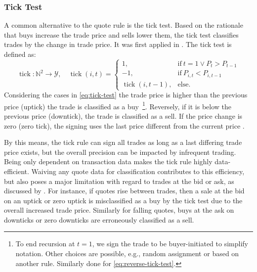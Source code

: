 \subsubsection{Tick Test}\label{sec:tick-test}

A common alternative to the quote rule is the tick test. Based on the rationale that buys increase the trade price and sells lower them, the tick test classifies trades by the change in trade price. It was first applied in \textcites[][244]{holthausenEffectLargeBlock1987}[][240]{hasbrouckTradesQuotesInventories1988}. The tick test is defined as:
\begin{equation}
    \operatorname{tick}\colon \mathbb{N}^2 \to \mathcal{Y},\quad
    \operatorname{tick}(i, t)=
    \begin{cases}
        1,                           & \mathrm{if}\ t=1 \lor P_{t}>P_{t-1} \\
        -1,                          & \mathrm{if}\ P_{i, t} < P_{i, t-1}  \\
        \operatorname{tick}(i, t-1), & \mathrm{else}.
    \end{cases}
    \label{eq:tick-test}
\end{equation}
Considering the cases in \cref{eq:tick-test} the trade price is higher than the previous price (uptick) the trade is classified as a buy~\footnote{To end recursion at $t=1$, we sign the trade to be buyer-initiated to simplify notation. Other choices are possible, e.g., random assignment or based on another rule. Similarly done for \cref{eq:reverse-tick-test}.}. Reversely, if it is below the previous price (downtick), the trade is classified as a sell. If the price change is zero (zero tick), the signing uses the last price different from the current price \autocite[][735]{leeInferringTradeDirection1991}.

By this means, the tick rule can sign all trades as long as a last differing trade price exists, but the overall precision can be impacted by infrequent trading. Being only dependent on transaction data makes the tick rule highly data-efficient. Waiving any quote data for classification contributes to this efficiency, but also poses a major limitation with regard to trades at the bid or ask, as discussed by \textcite[][557--558]{finucaneDirectTestMethods2000}. For instance, if quotes rise between trades, then a sale at the bid on an uptick or zero uptick is misclassified as a buy by the tick test due to the overall increased trade price. Similarly for falling quotes, buys at the ask on downticks or zero downticks are erroneously classified as a sell.


